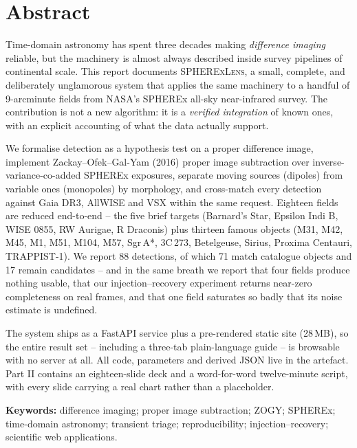 \documentclass[11pt,a4paper]{article}
\begin{document}
\section*{Abstract}
\noindent
Time-domain astronomy has spent three decades making \emph{difference imaging} reliable, but the
machinery is almost always described inside survey pipelines of continental scale. This report
documents \textsc{SPHERExLens}, a small, complete, and deliberately unglamorous system that applies
the same machinery to a handful of 9-arcminute fields from NASA's SPHEREx all-sky near-infrared
survey. The contribution is not a new algorithm: it is a \emph{verified integration} of known ones,
with an explicit accounting of what the data actually support.

We formalise detection as a hypothesis test on a proper difference image, implement
Zackay--Ofek--Gal-Yam (2016) proper image subtraction over inverse-variance-co-added SPHEREx
exposures, separate moving sources (dipoles) from variable ones (monopoles) by morphology, and
cross-match every detection against Gaia DR3, AllWISE and VSX within the same request. Eighteen
fields are reduced end-to-end -- the five brief targets (Barnard's Star, Epsilon Indi B, WISE 0855,
RW Aurigae, R Draconis) plus thirteen famous objects (M31, M42, M45, M1, M51, M104, M57, Sgr\,A*,
3C\,273, Betelgeuse, Sirius, Proxima Centauri, TRAPPIST-1). We report 88 detections, of which 71
match catalogue objects and 17 remain candidates -- and in the same breath we report that four
fields produce nothing usable, that our injection--recovery experiment returns near-zero
completeness on real frames, and that one field saturates so badly that its noise estimate is
undefined.

The system ships as a FastAPI service plus a pre-rendered static site (28\,MB), so the entire result
set -- including a three-tab plain-language guide -- is browsable with no server at all. All code,
parameters and derived JSON live in the artefact. Part II contains an eighteen-slide deck and a
word-for-word twelve-minute script, with every slide carrying a real chart rather than a placeholder.

\vspace{0.6em}
\noindent\textbf{Keywords:} difference imaging; proper image subtraction; ZOGY; SPHEREx; time-domain
astronomy; transient triage; reproducibility; injection--recovery; scientific web applications.
\end{document}
